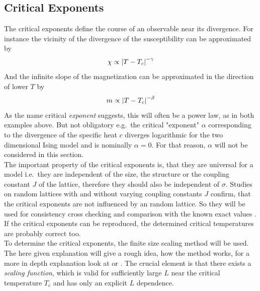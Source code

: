\subsection{Critical Exponents}
    The critical exponents define the course of an observable near its
    divergence. For instance the vicinity of the divergence of the susceptibility
    can be approximated by
    \begin{equation}
        \chi \propto \left\vert T-T_{c}\right\vert^{-\gamma}
        \label{eq:critExp:gamma}
    \end{equation}
    And the infinite slope of the magnetization can be approximated in
    the direction of lower \(T\) by
    \begin{equation}
        m \propto \left\vert T-T_{c}\right\vert^{-\beta}
        \label{eq:critExp:beta}
    \end{equation}
    As the name critical \emph{exponent} suggests, this will often
    be a power law, as in both examples above. But not obligatory e.g.\
    the critical "exponent" \(\alpha\) corresponding to the divergence of
    the specific heat \(c\) diverges logarithmic for the two dimensional
    Ising model and is nominally \(\alpha = 0\).
    For that reason, \(\alpha\) will not be considered in this section.\\
    The important property of the critical exponents is, that they are
    universal for a model i.e.\ they are independent of the size, the structure
    or the coupling constant \(J\) \cite{NewmanBarkema1999} of the lattice,
    therefore they should also be independent of \(\sigma\).
    Studies on random lattices with\cite{Lima2000} and without\cite{Janke1994}
    varying coupling constants \(J\) confirm, that the
    critical exponents are not influenced by an random lattice.
    So they will be used for consistency cross checking and
    comparison with the known exact values \cite[p. 59]{Pelissetto2002}.
    If the critical exponents can be reproduced, the determined critical
    temperatures are probably correct too.\\
    To determine the critical exponents, the finite size scaling method
    will be used. The here given explanation will give a rough idea, how
    the method works, for a more in depth explanation look at \cite{Norrenbrock2011} or \cite{NewmanBarkema1999}.
    The crucial element is that there exists a \emph{scaling function},
    which is valid for sufficiently large \(L\) near the critical
    temperature \(T_{c}\) and has only an explicit \(L\) dependence.
